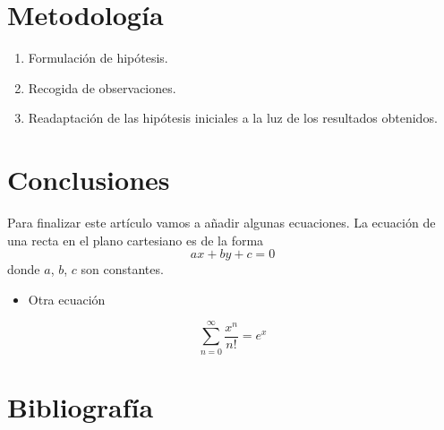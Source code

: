\documentclass{article}
\begin{document}
\section{Metodología}
\begin{enumerate}
    \item Formulación de hipótesis.
    \item Recogida de observaciones.
    \item Readaptación de las hipótesis iniciales a la luz de los resultados obtenidos.
\end{enumerate}

\section{Conclusiones}
Para finalizar este artículo vamos a añadir algunas ecuaciones. La ecuación de una recta en el plano cartesiano es de la forma
$$ax+by+c=0$$
donde $a$, $b$, $c$ son constantes.\\

\begin{itemize}
\item Otra ecuación
\end{itemize}
\begin{equation}
\sum_{n=0}^\infty \frac{x^n}{n!}=e^x
\end{equation}

\section{Bibliografía}



 
\end{document}
